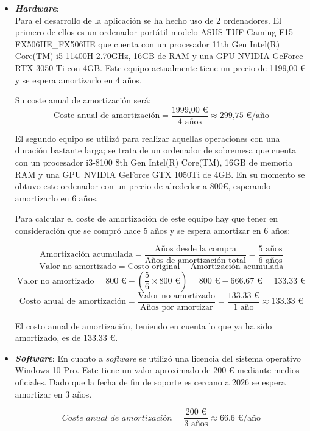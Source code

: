 \begin{itemize}
	\item \textbf{\textit{Hardware}}:\\ Para el desarrollo de la aplicación se ha hecho uso de 2 ordenadores. El primero de ellos es un ordenador portátil modelo ASUS TUF Gaming F15 FX506HE\_FX506HE que cuenta con un procesador 11th Gen Intel(R) Core(TM) i5-11400H 2.70GHz, 16GB de RAM y una GPU NVIDIA GeForce RTX 3050 Ti con 4GB. Este equipo actualmente tiene un precio de 1199,00 € y se espera amortizarlo en 4 años.
	
	Su coste anual de amortización será:
	\[
	\text{Coste anual de amortización} = \frac{\text{1999,00 €}}{\text{4 años}} \approx \text{299,75 €/año}
	\]
	
	 El segundo equipo se utilizó para realizar aquellas operaciones con una duración bastante larga; se trata de un ordenador de sobremesa que cuenta con un procesador i3-8100 8th Gen Intel(R) Core(TM), 16GB de memoria RAM y una GPU NVIDIA GeForce GTX 1050Ti de 4GB. En su momento se obtuvo este ordenador con un precio de alrededor a 800€, esperando amortizarlo en 6 años.
	
	Para calcular el coste de amortización de este equipo hay que tener en consideración que se compró hace 5 años y se espera amortizar en 6 años:
	

\[
\text{Amortización acumulada} = \frac{\text{Años desde la compra}}{\text{Años de amortización total}} = \frac{5 \text{ años}}{6 \text{ años}}
\]
\[
\text{Valor no amortizado} = \text{Costo original} - \text{Amortización acumulada}
\]
\[
\text{Valor no amortizado} = 800 \text{ €} - \left(\frac{5}{6} \times 800 \text{ €}\right) = 800 \text{ €} - 666.67 \text{ €} = 133.33 \text{ €}
\]
\[
\text{Costo anual de amortización} = \frac{\text{Valor no amortizado}}{\text{Años por amortizar}} = \frac{133.33 \text{ €}}{1 \text{ año}} \approx 133.33 \text{ €}
\]

El costo anual de amortización, teniendo en cuenta lo que ya ha sido amortizado, es de 133.33 €.

\item \textbf{\textit{Software}}:
En cuanto a \textit{software} se utilizó una licencia del sistema operativo Windows 10 Pro. Este tiene un valor aproximado de 200 € mediante medios oficiales. Dado que la fecha de fin de soporte es cercano a 2026 se espera amortizar en 3 años.

\[
\textit{Coste anual de amortización} = \frac{\text{200 €}}{\text{3 años}} \approx \text{66.6 €/año}
\]


\end{itemize}
